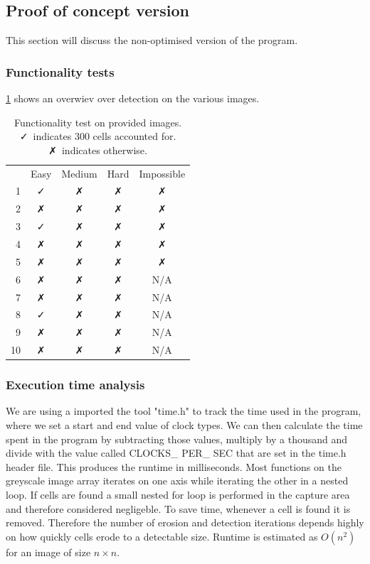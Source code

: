 \documentclass[a4paper, english]{article}
\numberwithin{equation}{section}
\begin{document}
\subsection{Proof of concept version}\label{sec:poctest}
This section will discuss the non-optimised version of the program.
\subsubsection{Functionality tests}
\cref{tbl:pocfunc} shows an overwiev over detection on the various images.
\begin{table}
    \centering
    \caption{Functionality test on provided images. \faCheck \ indicates 300 cells accounted for. \faClose \ indicates otherwise.}\label{tbl:pocfunc}
    \begin{tabular}{rcccc}
           & Easy     & Medium   & Hard     & Impossible \\
        1  & \faCheck & \faClose & \faClose & \faClose   \\
        2  & \faClose & \faClose & \faClose & \faClose   \\
        3  & \faCheck & \faClose & \faClose & \faClose   \\
        4  & \faClose & \faClose & \faClose & \faClose   \\
        5  & \faClose & \faClose & \faClose & \faClose   \\
        6  & \faClose & \faClose & \faClose & N/A        \\
        7  & \faClose & \faClose & \faClose & N/A        \\
        8  & \faCheck & \faClose & \faClose & N/A        \\
        9  & \faClose & \faClose & \faClose & N/A        \\
        10 & \faClose & \faClose & \faClose & N/A        \\
    \end{tabular}
\end{table}
\subsubsection{Execution time analysis}
We are using a imported the tool "time.h" to track the time used in the program, where we set a start and end value of clock types. We can then calculate the time spent in the program by subtracting those values, multiply by a thousand and divide with the value called CLOCKS\_ PER\_ SEC that are set in the time.h header file. This produces the runtime in milliseconds.\newline
Most functions on the greyscale image array iterates on one axis while iterating the other in a nested loop. If cells are found a small nested for loop is performed in the capture area and therefore considered negligeble. To save time, whenever a cell is found it is removed. Therefore the number of erosion and detection iterations depends highly on how quickly cells erode to a detectable size.
Runtime is estimated as \(O(n^2)\) for an image of size \(n\times n\).
\end{document}
